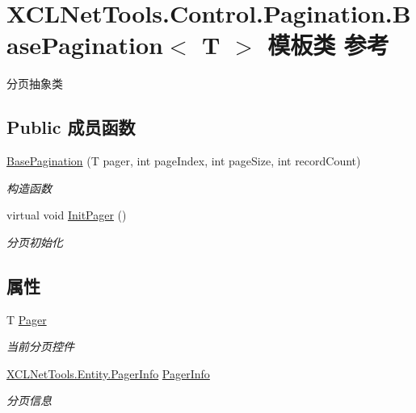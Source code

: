 \hypertarget{class_x_c_l_net_tools_1_1_control_1_1_pagination_1_1_base_pagination}{}\section{X\+C\+L\+Net\+Tools.\+Control.\+Pagination.\+Base\+Pagination$<$ T $>$ 模板类 参考}
\label{class_x_c_l_net_tools_1_1_control_1_1_pagination_1_1_base_pagination}


分页抽象类  


\subsection*{Public 成员函数}
\begin{DoxyCompactItemize}
\item 
\hyperlink{class_x_c_l_net_tools_1_1_control_1_1_pagination_1_1_base_pagination_ae9e336c1452804e7d4de12ea9fa3ddde}{Base\+Pagination} (T pager, int page\+Index, int page\+Size, int record\+Count)
\begin{DoxyCompactList}\small\item\em 构造函数 \end{DoxyCompactList}\item 
virtual void \hyperlink{class_x_c_l_net_tools_1_1_control_1_1_pagination_1_1_base_pagination_ab3485196d5422f857f29f96bfbb2faa9}{Init\+Pager} ()
\begin{DoxyCompactList}\small\item\em 分页初始化 \end{DoxyCompactList}\end{DoxyCompactItemize}
\subsection*{属性}
\begin{DoxyCompactItemize}
\item 
T \hyperlink{class_x_c_l_net_tools_1_1_control_1_1_pagination_1_1_base_pagination_ae0cfdba3ea23387da4b851c4d695d0a0}{Pager}
\begin{DoxyCompactList}\small\item\em 当前分页控件 \end{DoxyCompactList}\item 
\hyperlink{class_x_c_l_net_tools_1_1_entity_1_1_pager_info}{X\+C\+L\+Net\+Tools.\+Entity.\+Pager\+Info} \hyperlink{class_x_c_l_net_tools_1_1_control_1_1_pagination_1_1_base_pagination_ae27d645cd692bb7471bc6236c59496a3}{Pager\+Info}
\begin{DoxyCompactList}\small\item\em 分页信息 \end{DoxyCompactList}\end{DoxyCompactItemize}


